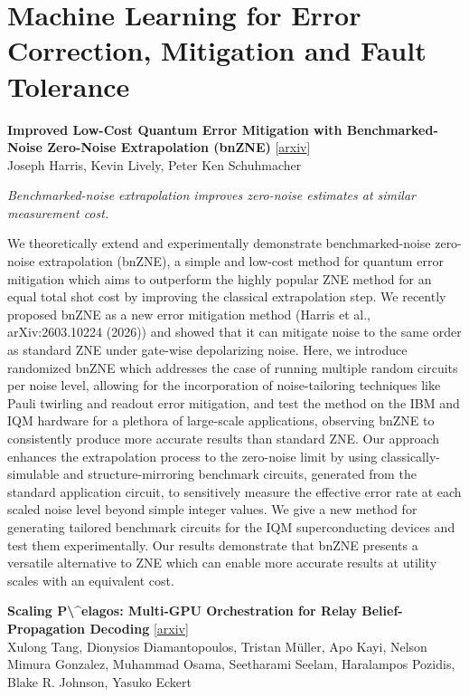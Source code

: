 \documentclass[12pt,letterpaper]{article}
\begin{document}
\section*{Machine Learning for Error Correction, Mitigation and Fault Tolerance}
{\small\textbf{Improved Low-Cost Quantum Error Mitigation with Benchmarked-Noise Zero-Noise Extrapolation (bnZNE)}} {\scriptsize[\href{https://arxiv.org/abs/2611.16971}{arxiv}]}\nopagebreak\\
{\scriptsize Joseph Harris, Kevin Lively, Peter Ken Schuhmacher}\nopagebreak\\[2pt]
{\footnotesize\textit{Benchmarked-noise extrapolation improves zero-noise estimates at similar measurement cost.}\par}\nopagebreak
{\footnotesize We theoretically extend and experimentally demonstrate benchmarked-noise zero-noise extrapolation (bnZNE), a simple and low-cost method for quantum error mitigation which aims to outperform the highly popular ZNE method for an equal total shot cost by improving the classical extrapolation step. We recently proposed bnZNE as a new error mitigation method (Harris et al., arXiv:2603.10224 (2026)) and showed that it can mitigate noise to the same order as standard ZNE under gate-wise depolarizing noise. Here, we introduce randomized bnZNE which addresses the case of running multiple random circuits per noise level, allowing for the incorporation of noise-tailoring techniques like Pauli twirling and readout error mitigation, and test the method on the IBM and IQM hardware for a plethora of large-scale applications, observing bnZNE to consistently produce more accurate results than standard ZNE. Our approach enhances the extrapolation process to the zero-noise limit by using classically-simulable and structure-mirroring benchmark circuits, generated from the standard application circuit, to sensitively measure the effective error rate at each scaled noise level beyond simple integer values. We give a new method for generating tailored benchmark circuits for the IQM superconducting devices and test them experimentally. Our results demonstrate that bnZNE presents a versatile alternative to ZNE which can enable more accurate results at utility scales with an equivalent cost.\par}
\medskip
{\small\textbf{Scaling P\textbackslash{}\textasciicircum{}elagos: Multi-GPU Orchestration for Relay Belief-Propagation Decoding}} {\scriptsize[\href{https://arxiv.org/abs/2611.16285}{arxiv}]}\nopagebreak\\
{\scriptsize Xulong Tang, Dionysios Diamantopoulos, Tristan M\"uller, Apo Kayi, Nelson Mimura Gonzalez, Muhammad Osama, Seetharami Seelam, Haralampos Pozidis, Blake R. Johnson, Yasuko Eckert}\nopagebreak\\[2pt]
\end{document}

